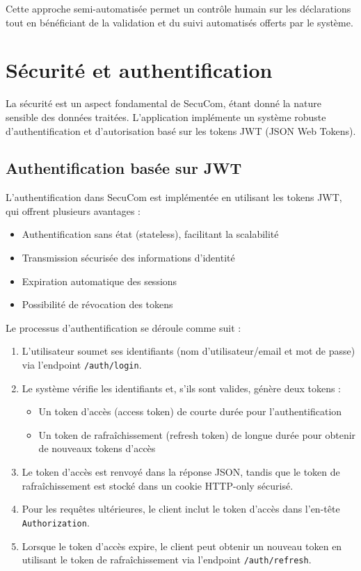 \documentclass[12pt,a4paper]{report}
\begin{document}
Cette approche semi-automatisée permet un contrôle humain sur les déclarations tout en bénéficiant de la validation et du suivi automatisés offerts par le système.

\section{Sécurité et authentification}

La sécurité est un aspect fondamental de SecuCom, étant donné la nature sensible des données traitées. L'application implémente un système robuste d'authentification et d'autorisation basé sur les tokens JWT (JSON Web Tokens).

\subsection{Authentification basée sur JWT}

L'authentification dans SecuCom est implémentée en utilisant les tokens JWT, qui offrent plusieurs avantages :
\begin{itemize}
  \item Authentification sans état (stateless), facilitant la scalabilité
  \item Transmission sécurisée des informations d'identité
  \item Expiration automatique des sessions
  \item Possibilité de révocation des tokens
\end{itemize}

Le processus d'authentification se déroule comme suit :

\begin{enumerate}
  \item L'utilisateur soumet ses identifiants (nom d'utilisateur/email et mot de passe) via l'endpoint \texttt{/auth/login}.
  \item Le système vérifie les identifiants et, s'ils sont valides, génère deux tokens :
    \begin{itemize}
      \item Un token d'accès (access token) de courte durée pour l'authentification
      \item Un token de rafraîchissement (refresh token) de longue durée pour obtenir de nouveaux tokens d'accès
    \end{itemize}
  \item Le token d'accès est renvoyé dans la réponse JSON, tandis que le token de rafraîchissement est stocké dans un cookie HTTP-only sécurisé.
  \item Pour les requêtes ultérieures, le client inclut le token d'accès dans l'en-tête \texttt{Authorization}.
  \item Lorsque le token d'accès expire, le client peut obtenir un nouveau token en utilisant le token de rafraîchissement via l'endpoint \texttt{/auth/refresh}.
\end{enumerate}
\end{document}
